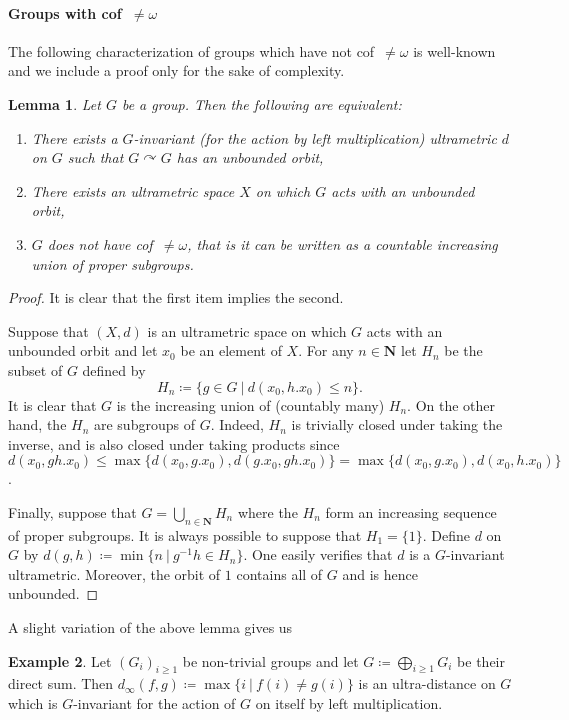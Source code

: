 \documentclass[a4paper]{article}
\newtheorem{lem}{Lemma}[section]
\theoremstyle{definition}
\newtheorem{exmp}[lem]{Example}
\newcommand*{\field}[1]{\mathbf{#1}}
\newcommand*{\N}{\field{N}}
\newcommand{\setst}[2]{\{#1\ |\ #2\}}
\begin{document}
\paragraph{Groups with cof~$\neq\omega$}
The following characterization of groups which have not cof~$\neq\omega$ is well-known and we include a proof only for the sake of complexity.
%
%
\begin{lem}\label{Lemma:CofSub}
Let $G$ be a group. Then the following are equivalent:
\begin{enumerate}
\item There exists a $G$-invariant (for the action by left multiplication) ultrametric $d$ on $G$ such that $G\curvearrowright G$ has an unbounded orbit,
\item There exists an ultrametric space $X$ on which $G$ acts with an unbounded orbit,
\item $G$ does not have cof~$\neq\omega$, that is it can be written as a countable increasing union of proper subgroups.
\end{enumerate}
\end{lem}
\begin{proof}
It is clear that the first item implies the second.

Suppose that $(X,d)$ is an ultrametric space on which $G$ acts with an unbounded orbit and let $x_0$ be an element of $X$. For any $n\in \N$ let $H_n$ be the subset of $G$ defined by
\[
	H_n\coloneqq\setst{g\in G}{d(x_0,h.x_0)\leq n}.
\]
It is clear that $G$ is the increasing union of (countably many) $H_n$.
On the other hand, the $H_n$ are subgroups of $G$. Indeed, $H_n$ is trivially closed under taking the inverse, and is also closed under taking products since $d(x_0,gh.x_0)\leq\max\{d(x_0,g.x_0),d(g.x_0,gh.x_0)\}=\max\{d(x_0,g.x_0),d(x_0,h.x_0)\}$.

Finally, suppose that $G=\bigcup_{n\in \N}H_n$ where the $H_n$ form an increasing sequence of proper subgroups. It is always possible to suppose that $H_1=\{1\}$.
Define $d$ on $G$ by $d(g,h)\coloneqq\min\setst{n}{g^{-1}h\in H_n}$.
One easily verifies that $d$ is a $G$-invariant ultrametric. Moreover, the orbit of $1$ contains all of $G$ and is hence unbounded.
\end{proof}
%
%
A slight variation of the above lemma gives us
\begin{exmp}\label{Exmpl:Ultra}
Let $(G_i)_{i\geq 1}$ be non-trivial groups and let $G\coloneqq\bigoplus_{i\geq 1} G_i$ be their direct sum.
Then $d_\infty(f,g)\coloneqq\max\setst{i}{f(i)\neq g(i)}$ is an ultra-distance on $G$ which is $G$-invariant for the action of $G$ on itself by left multiplication.
\end{exmp}
\end{document}
